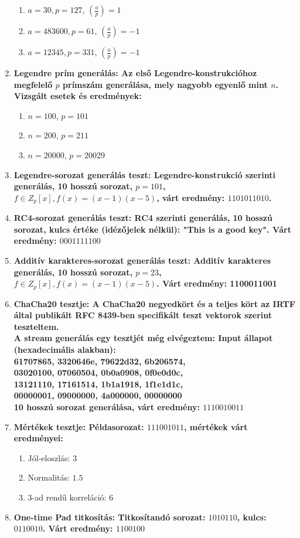 \documentclass[12pt]{article}
\begin{document}
\begin{enumerate}
\begin{enumerate}
		\item $a = 30, p = 127$, $\left({\frac{a}{p}}\right) = 1$
		\item $a = 483600, p = 61$, $\left({\frac{a}{p}}\right) = -1$
		\item $a = 12345, p = 331$, $\left({\frac{a}{p}}\right) = -1$
	\end{enumerate}
	\item \bfseries Legendre prím generálás:
	\normalfont Az első Legendre-konstrukcióhoz megfelelő $p$ prímszám generálása, mely nagyobb egyenlő mint $n$. Vizsgált esetek és eredmények:
	\begin{enumerate}
		\item $n = 100$, $p = 101$
		\item $n = 200$, $p = 211$
		\item $n = 20000$, $p = 20029$
	\end{enumerate}
	\item  \bfseries Legendre-sorozat generálás teszt:
	\normalfont Legendre-konstrukció szerinti generálás, 10 hosszú sorozat, $p = 101$, $f \in Z_p[x], f(x) = (x-1)(x-5)$, várt eredmény:	$1101011010$.
	\item \bfseries RC4-sorozat generálás teszt:
	\normalfont RC4 szerinti generálás, 10 hosszú sorozat, kulcs értéke (idézőjelek nélkül): "This is a good key". Várt eredmény: $0001111100$
	\item \bfseries Additív karakteres-sorozat generálás teszt:
	\normalfont Additív karakteres generálás, 10 hosszú sorozat, $p = 23$, $f \in Z_p[x], f(x) = (x-1)(x-5)$. Várt eredmény: 1100011001
	\item \bfseries ChaCha20 tesztje:
	\normalfont  A ChaCha20 negyedkört és a teljes kört az IRTF által publikált RFC 8439-ben specifikált teszt vektorok szerint teszteltem.
	\\ A stream generálás egy tesztjét még elvégeztem:
	Input állapot (hexadecimális alakban): \\
	    61707865, 3320646e, 79622d32, 6b206574, \\
		03020100, 07060504, 0b0a0908, 0f0e0d0c, \\
		13121110, 17161514, 1b1a1918, 1f1e1d1c, \\
		00000001, 09000000, 4a000000, 00000000 \\
	10 hosszú sorozat generálása, várt eredmény: $1110010011$
	\item \bfseries Mértékek tesztje:
	\normalfont Példasorozat: $111001011$, mértékek várt eredményei:
	\begin{enumerate}
		\item Jól-eloszlás: $3$
		\item Normalitás: $1.5$
		\item 3-ad rendű korreláció: 6
	\end{enumerate}
\item \bfseries One-time Pad titkosítás:
\normalfont Titkosítandó sorozat: $1010110$, kulcs: $0110010$. Várt eredmény: $1100100$
\end{enumerate}
\end{document}
